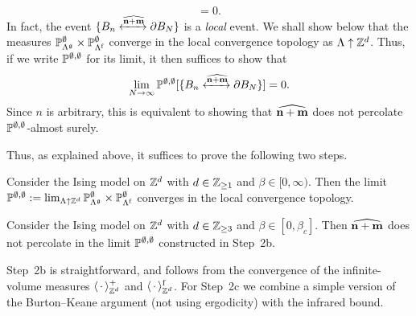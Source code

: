 \begin{itemize}
\begin{equation}
            [\{B_n \xleftrightarrow{\widehat{\n+\m}}\partial B_N\}]=0.
        \end{equation}
        In fact, the event $\{B_n \xleftrightarrow{\widehat{\n+\m}}\partial B_N\}$
        is a \emph{local} event.
        We shall show below that the measures
        $\P_{\Lambda^\frakg}^\emptyset\times\P_{\Lambda^\f}^\emptyset$
        converge in the local convergence topology as $\Lambda\uparrow\Z^d$.
        Thus, if we write $\P^{\emptyset,\emptyset}$ for its limit, it then suffices
        to show that
        \[
            \lim_{N\to\infty}\P^{\emptyset,\emptyset}
            [\{B_n \xleftrightarrow{\widehat{\n+\m}}\partial B_N\}]=0.
        \]
        Since $n$ is arbitrary, this is equivalent to showing
        that $\widehat{\n+\m}$ does not percolate $\P^{\emptyset,\emptyset}$-almost surely.
\end{itemize}

Thus, as explained above, it suffices to prove the following two steps.

\begin{lemma}\label{lemma:continuity_step2b}
    Consider the Ising model on $\Z^d$ with $d\in\Z_{\geq 1}$
    and $\beta\in[0,\infty)$.
    Then the limit $\P^{\emptyset,\emptyset}:=
    \lim_{\Lambda\uparrow\Z^d}
    \P_{\Lambda^\frakg}^\emptyset\times\P_{\Lambda^\f}^\emptyset
    $ converges in the local convergence topology.
\end{lemma}

\begin{lemma}\label{lemma:continuity_step2c}
    Consider the Ising model on $\Z^d$ with $d\in\Z_{\geq 3}$
    and $\beta\in[0,\beta_c]$.
    Then $\widehat{\n+\m}$ does not percolate in the limit $\P^{\emptyset,\emptyset}$ constructed
    in Step~2b.
\end{lemma}

Step~2b is straightforward, and follows
from the convergence of the infinite-volume measures $\langle\blank\rangle^+_{\Z^d}$
and $\langle\blank\rangle^\f_{\Z^d}$.
For Step~2c we combine a simple version of the Burton--Keane argument
(not using ergodicity)
with the infrared bound.

